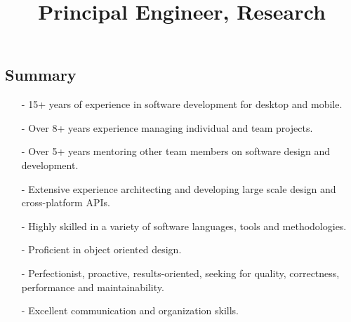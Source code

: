 \documentclass[9pt,a4paper,sans]{moderncv}
\title{Principal Engineer, Research}
\begin{document}
\begin{scriptsize}


\makecvtitle


\section{Summary}
\begin{itemize}
	\item[-] 15+ years of experience in software development for desktop and mobile.
	\item[-] Over 8+ years experience managing individual and team projects.
	\item[-] Over 5+ years mentoring other team members on software design and development.
	\item[-] Extensive experience architecting and developing large scale design and cross-platform APIs.
	\item[-] Highly skilled in a variety of software languages, tools and methodologies.
	\item[-] Proficient in object oriented design.
	\item[-] Perfectionist, proactive, results-oriented, seeking for quality, correctness, performance and maintainability.
	\item[-] Excellent communication and organization skills.
\end{itemize}



\end{scriptsize}
\end{document}
